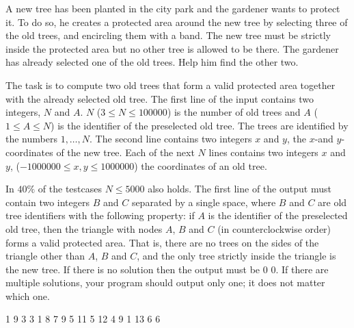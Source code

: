 





A new tree has been planted in the city park and the gardener wants to protect it. To do so, he creates a protected area around the new tree by selecting three of the old trees, and encircling them with a band. The new tree must be strictly inside the protected area but no other tree is allowed to be there. The gardener has already selected one of the old trees. Help him find the other two.

The task is to compute two old trees that form a valid protected area together with the already selected old tree.
The first line of the input contains two integers, $N$ and $A$. $N$ ($3 \leq N \leq 100000$) is the number of old trees and $A$ ($1 \leq A \leq N$) is the identifier of the preselected old tree. The trees are identified by the numbers $1,\ldots,N$. The second line contains two integers $x$ and $y$, the $x$-and $y$-coordinates of the new tree. Each of the next $N$ lines contains two integers $x$ and $y$, ($-1000000 \leq x,y \leq 1000000$) the coordinates of an old tree.

\bigskip
In $40 \%$ of the testcases $N \leq 5000$ also holds.
The first line of the output must contain two integers $B$ and $C$ separated by a single space, where $B$ and $C$ are old tree identifiers with the following property: if $A$ is the identifier of the preselected old tree, then the triangle with nodes $A$, $B$ and $C$ (in counterclockwise order) forms a valid protected area. That is, there are no trees on the sides of the triangle other than $A$, $B$ and $C$, and the only tree strictly inside the triangle is the new tree.
If there is no solution then the output must be 0 0. If there are multiple solutions, your program should output only one; it does not matter which one.

 1
9 3
3 1
8 7
9 5
11 5
12 4
9 1
13 6
 6
\sampleCOMMENT

\sampleEND
\bigskip


